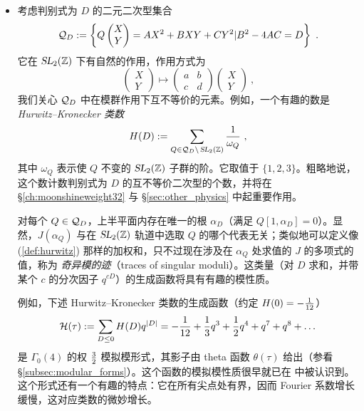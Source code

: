 \documentclass[11pt,a4paper,fontset=windows]{ctexart}
\numberwithin{equation}{section}
\newcommand{\SL}{\operatorname{\textsl{SL}}}      %
\newcommand{\HH}{\mathbb{H}}
\newcommand{\ZZ}{\mathbb{Z}}
\newcommand{\Z}{\mathbb{Z}}
\def\t{\tau}
\newcommand{\be}{\begin{equation}}
\newcommand{\ee}{\end{equation}}
\newcommand{\eq}[1]{(\ref{#1})}
\begin{document}
\begin{itemize}
\item{考虑判别式为 $D$ 的二元二次型集合
\be
{\cal Q}_D := \left\lbrace Q\left(\begin{matrix} X \\ Y \end{matrix}\right)=AX^2+BXY+CY^2\lvert B^2 -4AC = D\right\rbrace~. 
\ee
它在 $\SL_2(\Z)$ 下有自然的作用，作用方式为
\begin{equation}
\left(\begin{matrix} X \\ Y \end{matrix}\right)\mapsto\left(\begin{matrix} a & b \\ c & d \end{matrix}\right)\left(\begin{matrix} X \\ Y \end{matrix}\right)~,
\end{equation}
我们关心 ${\cal Q}_D$ 中在模群作用下互不等价的元素。例如，一个有趣的数是 {\em Hurwitz–Kronecker 类数}
\be\label{def:hurwitz}
H(D):= \sum_{Q\in {\cal Q}_D\backslash \SL_2(\ZZ)} {1\over \omega_Q}~,
\ee
其中 $\omega_Q$ 表示使 $Q$ 不变的 $\SL_2(\Z)$ 子群的阶。它取值于 $\{1,2,3\}$。粗略地说，这个数计数判别式为 $D$ 的互不等价二次型的个数，并将在 \S\ref{ch:moonshineweight32} 与 \S\ref{sec:other_physics} 中起重要作用。


对每个 $Q \in {\cal Q}_D$，上半平面内存在唯一的根 $\alpha_D$（满足 $Q[1,\alpha_D]=0$）。显然，$J(\alpha_Q)$ 与在 $\SL_2(\Z)$ 轨道中选取 $Q$ 的哪个代表无关；类似地可以定义像 \eq{def:hurwitz} 那样的加权和，只不过现在涉及在 $\alpha_Q$ 处求值的 $J$ 的多项式的值，称为 {\em 奇异模的迹}（traces of singular moduli）。这类量（对 $D$ 求和，并带某个 $c$ 的分次因子 $q^{cD}$）的生成函数将具有有趣的模性质。


例如，下述 Hurwitz–Kronecker 类数的生成函数（约定 $H(0)=-{1\over 12}$）
\be\label{hurwitz_mock}
{\cal H}(\tau) := \sum_{D\leq 0} H(D)q^{|D|} = -{1\over 12}+{1\over 3}q^3 +{1\over 2}q^4+q^7 + q^8 +\dots
\ee
是 $\Gamma_0(4)$ 的权 ${3\over 2}$ 模拟模形式，其影子由 theta 函数 $\theta(\t)$ 给出（参看 \S\ref{subsec:modular_forms}）。这个函数的模拟模性质很早就已在 \cite{MR0429750} 中被认识到。
这个形式还有一个有趣的特点：它在所有尖点处有界，因而 Fourier 系数增长缓慢，这对应类数的微妙增长。

}
\end{itemize}
\end{document}
